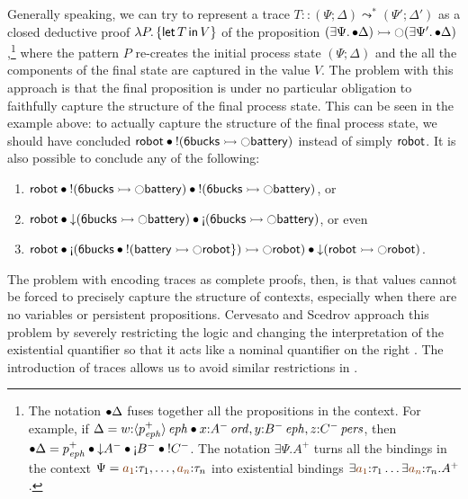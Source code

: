 Generally speaking, we can try to represent a trace $T :: (\Psi;
\Delta) \leadsto^* (\Psi'; \Delta')$ as a closed deductive proof
$\lambda P.\,\{{\sf let}\,{T}\,{\sf in}\, {V} \}$ of the proposition $(\exists
\Psi.\,{\mathbin{\bullet}}\Delta) \rightarrowtail {\ocircle}(\exists
\Psi'.\,{\mathbin{\bullet}}\Delta)$,\footnote{The notation ${\mathbin{\bullet}}{\Delta}$ fuses
  together all the propositions in the context. For example, if
  $\Delta = w{:}{\langle {p^+_{\it eph}} \rangle}\,{{\it eph}} \mathbin{\bullet} x{:}{A^-}\,{{\it ord}},
  y{:}{B^-}\,{{\it eph}}, z{:}{C^-}\,{{\it pers}}$, then ${\fuse}{\Delta} = p^+_\meph
  \fuse {\downarrow}A^- \fuse {\gnab}B^- \fuse {!}C^-$. The notation
  $\exists \Psi. A^+$ turns all the bindings in the context $\Psi =
  \lf{a_1}{:}\tau_1,\ldots,\lf{a_n}{:}\tau_n$ into existential
  bindings $\exists \lf{a_1}{:}\tau_1\ldots\exists
  \lf{a_n}{:}\tau_n.A^+$.}  where the pattern $P$ re-creates the initial
process state $(\Psi; \Delta)$ and the all the components of the final
state are captured in the value $V$.  The problem with this approach
is that the final proposition is under no particular obligation to
faithfully
capture the structure of the final process state. This can be seen in
the example above: to actually capture the structure of the final
process state, we should have concluded ${\sf robot} \mathbin{\bullet} {!}({\sf
  6bucks} \rightarrowtail {\ocircle}{\sf battery})$ instead of simply ${\sf
  robot}$. It is also possible to conclude any of the following:
\smallskip
\begin{enumerate}
\item ${\sf robot} \mathbin{\bullet} {!}({\sf 6bucks} \rightarrowtail {\ocircle}{\sf
  battery}) \mathbin{\bullet} {!}({\sf 6bucks} \rightarrowtail {\ocircle}{\sf
  battery})$, or 
\item ${\sf robot} \fuse {\downarrow}({\sf 6bucks} \lefti {\ocircle}{\sf
  battery}) \fuse {\gnab}({\sf 6bucks} \lefti {\ocircle}{\sf
  battery})$, or even
\item ${\sf robot}  \fuse {\gnab}({\sf 6bucks} \fuse {!}({\sf battery} \lefti {\ocircle}{\sf robot} \}) \lefti {\ocircle}{\sf robot})
  \fuse {\downarrow}({\sf robot}
\lefti {\ocircle}{\sf robot})$.
\end{enumerate}
\smallskip 
%
The problem with encoding traces as complete proofs, then, is that
values cannot be forced to 
precisely capture the structure of contexts, especially when there are
no variables or persistent propositions. Cervesato and Scedrov
approach this problem by severely restricting the logic and changing
the interpretation of the existential quantifier so that it acts like
a nominal quantifier on the right \cite{cervesato09relating}. The
introduction of traces allows us to avoid similar restrictions in
\sls.

